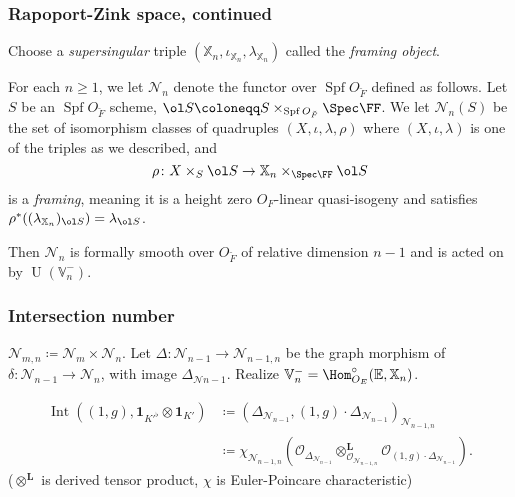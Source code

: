 \documentclass[11pt]{beamer}
\DeclareMathOperator{\Int}{Int}
\DeclareMathOperator{\Spf}{Spf}
\DeclareMathOperator{\U}{U}
\newcommand{\EE}{\mathbb{E}}
\newcommand{\VV}{\mathbb{V}}
\newcommand{\XX}{\mathbb{X}}
\renewcommand{\OO}{O}
\newcommand{\RZ}{\mathcal{N}}
\newcommand{\Sheaf}{\mathcal O}
\newcommand{\jiao}{\mathop{\otimes}^{\mathbf{L}}} %
\begin{document}
\begin{frame}
  \frametitle{Rapoport-Zink space, continued}
  Choose a \emph{supersingular} triple $(\XX_n, \iota_{\XX_n}, \lambda_{\XX_n})$
  called the \emph{framing object}.
  \begin{definition}
    For each $n \ge 1$, we let $\RZ_n$ denote the
    functor over $\Spf \OO_{\breve F}$ defined as follows.
    Let $S$ be an $\Spf \OO_{\breve F}$ scheme,
    $\ol S \coloneqq S \times_{\Spf \OO_{\breve F}} \Spec \FF$.
    We let $\RZ_n(S)$ be the set of isomorphism classes of quadruples
    $(X, \iota, \lambda, \rho)$
    where $(X, \iota, \lambda)$ is one of the triples as we described, and
    \[ \rho \colon X \times_S \ol S \to \XX_n \times_{\Spec \FF} \ol S \]
    is a \emph{framing}, meaning it is a height zero $\OO_F$-linear quasi-isogeny
    and satisfies $\rho^\ast((\lambda_{\XX_n})_{\ol S}) = \lambda_{\ol S}$.
  \end{definition}
  Then $\RZ_n$ is formally smooth over $\OO_{\breve F}$ of relative dimension $n-1$
  and is acted on by $\U(\VV_n^-)$.
\end{frame}
\begin{frame}
  \frametitle{Intersection number}
  \begin{itemize}
    \ii $\RZ_{m,n} \coloneqq \RZ_m \times \RZ_n$.
    \ii Let $\Delta \colon \RZ_{n-1} \to \RZ_{n-1,n}$
    be the graph morphism of $\delta \colon \RZ_{n-1} \to \RZ_n$,
    with image $\Delta_{\RZ{n-1}}$.
    \ii Realize $\VV_n^- = \Hom_{\OO_E}^\circ(\EE, \XX_n)$.
  \end{itemize}

  \begin{definition}
    \begin{align*}
      \Int((1,g), \mathbf{1}_{K'^\flat} \otimes \mathbf{1}_{K'})
      &\coloneqq \left( \Delta_{\RZ_{n-1}}, (1,g) \cdot \Delta_{\RZ_{n-1}} \right)_{\RZ_{n-1,n}} \\
      &\coloneqq \chi_{\RZ_{n-1,n}}
      \left( \Sheaf_{\Delta_{\RZ_{n-1}}} \jiao_{\Sheaf_{\RZ_{n-1,n}}} \Sheaf_{(1,g) \cdot \Delta_{\RZ_{n-1}}} \right) .
    \end{align*}
    ($\jiao$ is derived tensor product, $\chi$ is Euler-Poincare characteristic)
  \end{definition}

\end{frame}
\end{document}
